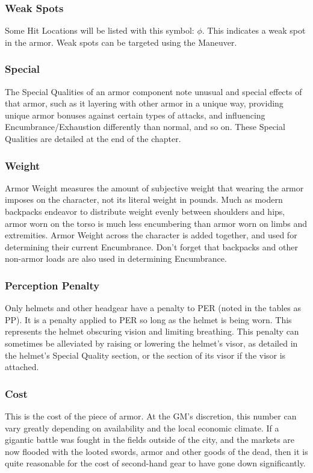 \documentclass[oneside,11pt,english]{book}
\begin{document}
\subsubsection{Weak Spots}\label{sec:Weak Spots}
Some Hit Locations will be listed with this symbol: $\phi$. This indicates a
weak spot in the armor. Weak spots can be targeted using the  Maneuver. 

\subsubsection{Special}
The Special Qualities of an armor component note unusual and special effects of
that armor, such as it layering with other armor in a unique way, providing
unique armor bonuses against certain types of attacks, and influencing
Encumbrance/Exhaustion differently than normal, and so on. These Special
Qualities are detailed at the end of the chapter. 

\subsubsection{Weight}
Armor Weight measures the amount of subjective weight that wearing the armor imposes on the character, not its 
literal weight in pounds. Much as modern backpacks endeavor to distribute weight evenly between shoulders and hips,
armor worn on the torso is much less encumbering than armor worn on limbs and extremities.
Armor Weight across the character is added together, and used for determining their current Encumbrance. Don’t 
forget that backpacks and other non-armor loads are also used in determining Encumbrance.

\subsubsection{Perception Penalty}
Only helmets and other headgear have a penalty to PER (noted in the tables as
PP). It is a penalty applied to PER so long as the helmet is being worn. This
represents the helmet obscuring vision and limiting breathing. This penalty can
sometimes be alleviated by raising or lowering the helmet’s visor, as detailed
in the helmet’s Special Quality section, or the section of its visor if the
visor is attached. 

\subsubsection{Cost}
This is the cost of the piece of armor. At the GM’s discretion, this number can vary greatly depending on availability 
and the local economic climate. If a gigantic battle was fought in the fields outside of the city, and the markets are 
now flooded with the looted swords, armor and other goods of the dead, then it is quite reasonable for the cost of 
second-hand gear to have gone down significantly.
\end{document}
